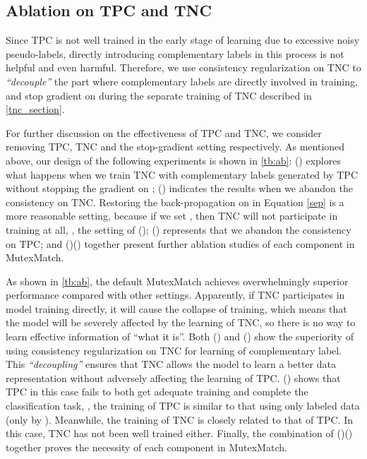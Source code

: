 \documentclass[lettersize,journal]{IEEEtran}
\theoremstyle{plain}
\theoremstyle{definition}
\theoremstyle{remark}
\begin{document}
\subsection{Ablation on TPC and TNC}
\label{abl:tt}
Since TPC is not well trained in the early stage of learning due to excessive noisy pseudo-labels, directly introducing complementary labels in this process is not helpful and even harmful. 
Therefore, we use consistency regularization on TNC to \textit{``decouple''}  the part where complementary labels are directly involved in training, and stop gradient on  during the separate training of TNC described in \cref{tnc_section}.  

For further discussion on the effectiveness of TPC and TNC, we consider removing TPC, TNC and the stop-gradient setting respectively.  As mentioned above, our design of the following experiments is shown in \cref{tb:ab}:  
() explores what happens when we train TNC with complementary labels generated by TPC without stopping the gradient on ; () indicates the results when we abandon the consistency on TNC. Restoring the back-propagation on   in Equation \eqref{sep} is a more reasonable setting, because if we set , then TNC will not participate in training at all, \ie, the setting of (); () represents that we abandon the consistency on TPC; and  ()() together present further ablation studies of each component in MutexMatch. 

As shown  in \cref{tb:ab}, the default MutexMatch achieves overwhelmingly superior performance compared with other settings. 
Apparently, if TNC participates in model training directly, it will cause the collapse of training, which means that the model will be severely affected by the learning of TNC, so there is no way to learn effective information of ``what it is''. Both () and () show the superiority of using consistency regularization on TNC for learning of complementary label. This \textit{``decoupling''} ensures that TNC allows the model to learn a better data representation without adversely affecting the learning of TPC. () shows that TPC in this case fails to both get adequate training and complete the classification task, \ie, the training of TPC is similar to that using only labeled data (only by ). Meanwhile, the training of TNC is closely related to that of TPC. In this case, TNC has not been well trained either.  
Finally, the combination of ()() together proves the necessity of each component in MutexMatch. 
\end{document}
